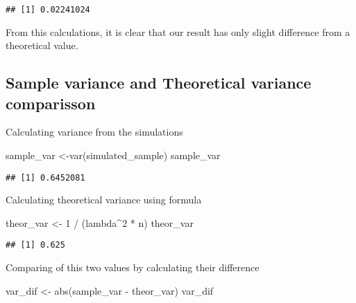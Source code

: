\documentclass[
]{article}
\newenvironment{Shaded}{\begin{snugshade}}{\end{snugshade}}
\newcommand{\DecValTok}[1]{\textcolor[rgb]{0.00,0.00,0.81}{#1}}
\newcommand{\FunctionTok}[1]{\textcolor[rgb]{0.00,0.00,0.00}{#1}}
\newcommand{\NormalTok}[1]{#1}
\newcommand{\OtherTok}[1]{\textcolor[rgb]{0.56,0.35,0.01}{#1}}
\newcommand{\SpecialCharTok}[1]{\textcolor[rgb]{0.00,0.00,0.00}{#1}}
\begin{document}
\begin{verbatim}
## [1] 0.02241024
\end{verbatim}

From this calculations, it is clear that our result has only slight
difference from a theoretical value.

\hypertarget{sample-variance-and-theoretical-variance-comparisson}{%
\subsection{Sample variance and Theoretical variance
comparisson}\label{sample-variance-and-theoretical-variance-comparisson}}

Calculating variance from the simulations

\begin{Shaded}
\begin{Highlighting}[]
\NormalTok{sample\_var }\OtherTok{\textless{}{-}}\FunctionTok{var}\NormalTok{(simulated\_sample)}
\NormalTok{sample\_var}
\end{Highlighting}
\end{Shaded}

\begin{verbatim}
## [1] 0.6452081
\end{verbatim}

Calculating theoretical variance using formula

\begin{Shaded}
\begin{Highlighting}[]
\NormalTok{theor\_var }\OtherTok{\textless{}{-}} \DecValTok{1} \SpecialCharTok{/}\NormalTok{ (lambda}\SpecialCharTok{\^{}}\DecValTok{2} \SpecialCharTok{*}\NormalTok{ n)}
\NormalTok{theor\_var}
\end{Highlighting}
\end{Shaded}

\begin{verbatim}
## [1] 0.625
\end{verbatim}

Comparing of this two values by calculating their difference

\begin{Shaded}
\begin{Highlighting}[]
\NormalTok{var\_dif }\OtherTok{\textless{}{-}} \FunctionTok{abs}\NormalTok{(sample\_var }\SpecialCharTok{{-}}\NormalTok{ theor\_var)}
\NormalTok{var\_dif}
\end{Highlighting}
\end{Shaded}
\end{document}
